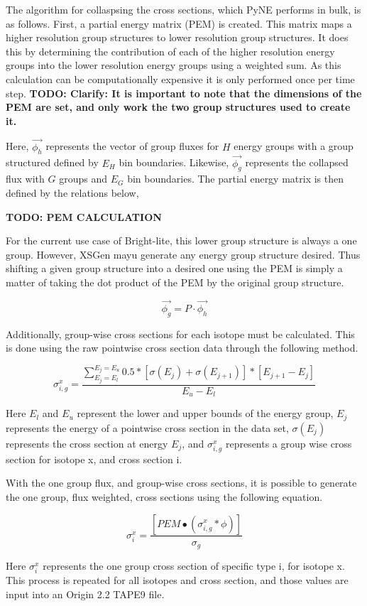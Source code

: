 \documentclass{article}
\newcommand{\TODO}[1] {{\color{red}\textbf{TODO: #1}}}
\begin{document}
The algorithm for collaspsing the cross sections, which PyNE performs in bulk, is as follows.
First, a partial energy matrix (PEM) is created. This matrix maps a higher resolution group
structures to lower resolution group structures. It does this by determining the contribution
of each of the higher resolution energy groups into the lower resolution energy groups using
a weighted sum. As this calculation can be computationally expensive it is only performed
once per time step. \TODO{Clarify: It is important to note that the dimensions of the PEM are set, and only
work the two group structures used to create it.}

Here, $\vec{\phi_h}$ represents the vector of group fluxes for $H$ energy groups with
a group structured defined by $E_H$ bin boundaries. Likewise, $\vec{\phi_g}$ represents
the collapsed flux with $G$ groups and $E_G$ bin boundaries. The partial energy
matrix is then defined by the relations below,

\TODO{PEM CALCULATION}

For the current use case of Bright-lite, this lower group structure is always a one group.
However, XSGen mayu generate any energy group structure desired.
Thus shifting a given group structure into a desired one using the PEM is simply a matter
of taking the dot product of the PEM by the original group structure.

\[ \vec{\phi_g} = P \cdot \vec{\phi_h} \]

Additionally, group-wise cross sections for each isotope must be calculated. This is done using the raw pointwise cross section data through the following method.

$$\sigma_{i,g}^x = \frac{\sum_{E_j=E_l}^{E_j=E_u}0.5*[\sigma(E_j)+\sigma(E_{j+1})]*[E_{j+1}-E_{j}]}{E_u-E_l}$$

Here $E_l$ and $E_u$ represent the lower and upper bounds of the energy group, $E_j$ represents the energy of a pointwise cross section in the data set, $\sigma(E_j)$ represents the cross section at energy $E_j$, and $\sigma_{i,g}^x$ represents a group wise cross section for isotope x, and cross section i.

With the one group flux, and group-wise cross sections, it is possible to generate the one group, flux weighted, cross sections using the following equation.

$$\sigma_{i}^x=\frac{[PEM∙(\sigma_{i,g}^x*\phi)]}{\sigma_g}$$

Here $\sigma_{i}^x$ represents the one group cross section of specific type i, for isotope x. This process is repeated for all isotopes and cross section, and those values are input into an Origin 2.2 TAPE9 file.
\end{document}
